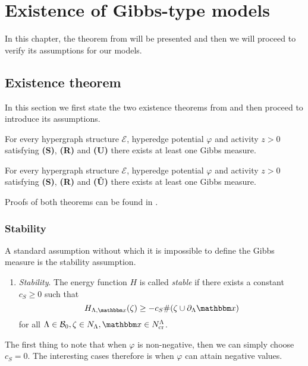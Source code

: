 \chapter{Existence of Gibbs-type models}\label{ch:3}
In this chapter, the theorem from \cite{DL07} will be presented and then we will proceed to verify its assumptions for our models.

\section{Existence theorem}
In this section we first state the two existence theorems from \cite{DL07} and then proceed to introduce its assumptions.

\begin{theorem}
	For every hypergraph structure $\mathcal E$, hyperedge potential $\varphi$ and activity $z>0$ satisfying \textbf{(S)}, \textbf{(R)} and \textbf{(U)} there exists at least one Gibbs measure.
\end{theorem}

\begin{theorem}
	For every hypergraph structure $\mathcal E$, hyperedge potential $\varphi$ and activity $z>0$ satisfying \textbf{(S)}, \textbf{(R)} and \textbf{(\^{U})} there exists at least one Gibbs measure.
\end{theorem}

Proofs of both theorems can be found in \cite{DL07}.

\subsection{Stability}
A standard assumption without which it is impossible to define the Gibbs measure is the stability assumption.

\begin{enumerate}[\textbf{(S)}] 
	\item \textit{Stability}. The energy function $H$ is called \textit{stable} if there exists a constant $c_S \geq 0$ such that 
$$H_{\Lambda,\x}(\zeta) \geq -c_S \#(\zeta \cup \partial_\Lambda \x)$$
for all $\Lambda \in \mathcal B_0, \zeta \in N_\Lambda, \x \in N^\Lambda_{\text{cr}}$.
\end{enumerate}


The first thing to note that when $\varphi$ is non-negative, then we can simply choose $c_S = 0$. The interesting cases therefore is when $\varphi$ can attain negative values.\newline

